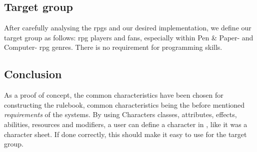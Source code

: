 \subsection*{Target group}
After carefully analysing the \ac{rpgs} and our desired implementation, we define our target group as follows:
\ac{rpg} players and fans, especially within Pen \& Paper- and Computer- \ac{rpg} genres. There is no requirement for programming skills.

\subsection{Conclusion}
As a proof of concept, the common characteristics have been chosen for constructing the rulebook, common characteristics being the before mentioned \emph{requirements} of the systems.
By using Characters classes, attributes, effects, abilities, resources and modifiers, a user can define a character in \langname{}, like it was a character sheet. If done correctly, this should make it easy to use for the target group.


